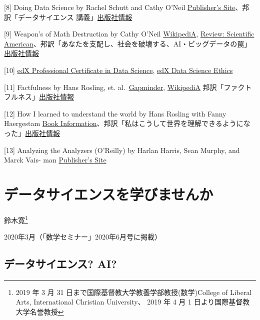 \documentclass[
]{book}
\theoremstyle{definition}
\theoremstyle{definition}
\theoremstyle{definition}
\theoremstyle{definition}
\theoremstyle{remark}
\begin{document}
{[}8{]} Doing Data Science by Rachel Schutt and Cathy O'Neil \href{https://www.oreilly.com/library/view/doing-data-science/9781449363871/}{Publisher's Site}、邦訳「データサイエンス 講義」\href{https://www.oreilly.co.jp/books/9784873117010/}{出版社情報}

{[}9{]} Weapon's of Math Destruction by Cathy O'Neil \href{https://en.wikipedia.org/wiki/Weapons_of_Math_Destruction}{WikipediA}, \href{https://blogs.scientificamerican.com/roots-of-unity/review-weapons-of-math-destruction/}{Review: Scientific American}、邦訳「あなたを支配し、社会を破壊する、AI・ビッグデータの罠」\href{http://www.intershift.jp/w_aibg.html}{出版社情報}

{[}10{]} \href{https://online-learning.harvard.edu/series/professional-certificate-data-science}{edX Professional Certificate in Data Science}, \href{https://www.edx.org/course/data-science-ethics}{edX Data Science Ethics}

{[}11{]} Factfulness by Hans Rosling, et. al.~\href{https://www.gapminder.org/factfulness-book/}{Gapminder}, \href{https://en.wikipedia.org/wiki/Factfulness:_Ten_Reasons_We\%27re_Wrong_About_the_World_–_and_Why_Things_Are_Better_Than_You_Think}{WikipediA} 邦訳「ファクトフルネス」\href{https://bookplus.nikkei.com/atcl/catalog/19/P89600/}{出版社情報}

{[}12{]} How I learned to understand the world by Hans Rosling with Fanny Haergestam \href{https://us.macmillan.com/books/9781250266903/howilearnedtounderstandtheworld}{Book Information}、邦訳「私はこうして世界を理解できるようになった」\href{http://www.seidosha.co.jp/book/index.php?id=3351}{出版社情報}

{[}13{]} Analyzing the Analyzers (O'Reilly) by Harlan Harris, Sean Murphy, and Marck Vais- man \href{https://www.oreilly.com/library/view/analyzing-the-analyzers/9781449368388/}{Publisher's Site}

\hypertarget{susemi202006}{%
\chapter{データサイエンスを学びませんか}\label{susemi202006}}

鈴木寛\footnote{2019 年 3 月 31 日まで国際基督教大学教養学部教授(数学)College of Liberal Arts, International Christian University、 2019 年 4 月 1 日より国際基督教大学名誉教授}

2020年3月（「数学セミナー」2020年6月号に掲載）

\hypertarget{ux30c7ux30fcux30bfux30b5ux30a4ux30a8ux30f3ux30b9-ai}{%
\section{データサイエンス? AI?}\label{ux30c7ux30fcux30bfux30b5ux30a4ux30a8ux30f3ux30b9-ai}}
\end{document}
